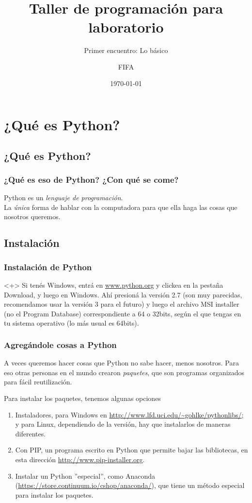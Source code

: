 \documentclass{beamer}
\title{Taller de programación para laboratorio}
\subtitle{Primer encuentro: Lo básico}
\author{FIFA}
\institute[FIFA]{Federación Interestudiantil de Física Argentina}
\date{\today}
\begin{document}
\begin{frame}
  \titlepage
\end{frame}


\section{¿Qué es Python?}

\subsection{¿Qué es Python?}
\begin{frame}
    \frametitle{¿Qué es eso de Python? ¿Con qué se come?}
    Python es un \emph{lenguaje de programación}.\\ La \emph{única} forma de hablar con la computadora para que ella haga las cosas que nosotros queremos.
\end{frame}

\subsection{Instalación}
\begin{frame}
    \frametitle{Instalación de Python}
    \begin{onlyenv}<+>
    Si tenés Windows, entrá en \url{www.python.org} y clickea en la pestaña Download, y luego en Windows. Ahí presioná la versión 2.7 (son muy parecidas, recomendamos usar la versión 3 para el futuro) y luego el archivo MSI installer (no el Program Database) correspondiente a 64 o 32bits, según el que tengas en tu sistema operativo (lo más usual es 64bits).
    \end{onlyenv}
\end{frame}



\begin{frame}
    \frametitle{Agregándole cosas a Python}
    A veces queremos hacer cosas que Python no sabe hacer, menos nosotros. Para eso otras personas en el mundo crearon \emph{paquetes}, que son programas organizados para fácil reutilización.
    
    Para instalar los paquetes, tenemos algunas opciones
    \begin{enumerate}
    \item{Instaladores, para Windows en \url{http://www.lfd.uci.edu/~gohlke/pythonlibs/}; y para Linux, dependiendo de la versión, hay que instalarlos de maneras diferentes.}
    \item{Con PIP, un programa escrito en Python que permite bajar las bibliotecas, en esta dirección \url{http://www.pip-installer.org}.}
    \item{Instalar un Python ''especial'', como Anaconda (\url{https://store.continuum.io/cshop/anaconda/}), que tiene un método especial para instalar los paquetes.}
    \end{enumerate}

\end{frame}
\end{document}
